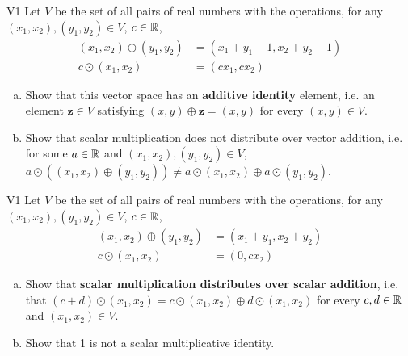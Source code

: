 \begin{problem}{V1}
Let \(V\) be the set of all pairs of real numbers with the operations, for any \((x_1,x_2), (y_1,y_2) \in V\), \(c\in \mathbb{R}\),
\begin{align*}
(x_1,x_2) \oplus (y_1,y_2) &= (x_1+y_1-1,x_2+y_2-1) \\
c \odot (x_1,x_2) &= (cx_1, cx_2)
\end{align*}
\begin{enumerate}[(a)]
\item Show that this vector space has an \textbf{additive identity} element, i.e. an element
      \(\mathbf{z} \in V\) satisfying \((x,y)\oplus\mathbf{z}=(x,y)\) for every \((x,y) \in V\).
\item Show that scalar multiplication does not distribute over vector addition, i.e. for some \(a \in \mathbb{R}\) and \( (x_1,x_2), (y_1,y_2) \in V\), \(a \odot \left( (x_1,x_2)\oplus (y_1,y_2) \right) \neq a \odot (x_1,x_2) \oplus a \odot (y_1,y_2) \).
\end{enumerate}
\end{problem}

\begin{problem}{V1}
Let \(V\) be the set of all pairs of real numbers with the operations, for any \((x_1,x_2), (y_1,y_2) \in V\), \(c\in \mathbb{R}\),
\begin{align*}
(x_1,x_2) \oplus (y_1,y_2) &= (x_1+y_1,x_2+y_2) \\
c \odot (x_1,x_2) &= (0, cx_2)
\end{align*}
\begin{enumerate}[(a)]
\item Show that \textbf{scalar multiplication
      distributes over scalar addition}, i.e. that
      \((c+d)\odot(x_1,x_2)=
      c\odot(x_1,x_2) \oplus d\odot(x_1,x_2)\) for every \(c,d \in \mathbb{R}\) and \( (x_1,x_2) \in V\).
\item Show that 1 is not a scalar multiplicative identity.
\end{enumerate}
\end{problem}



